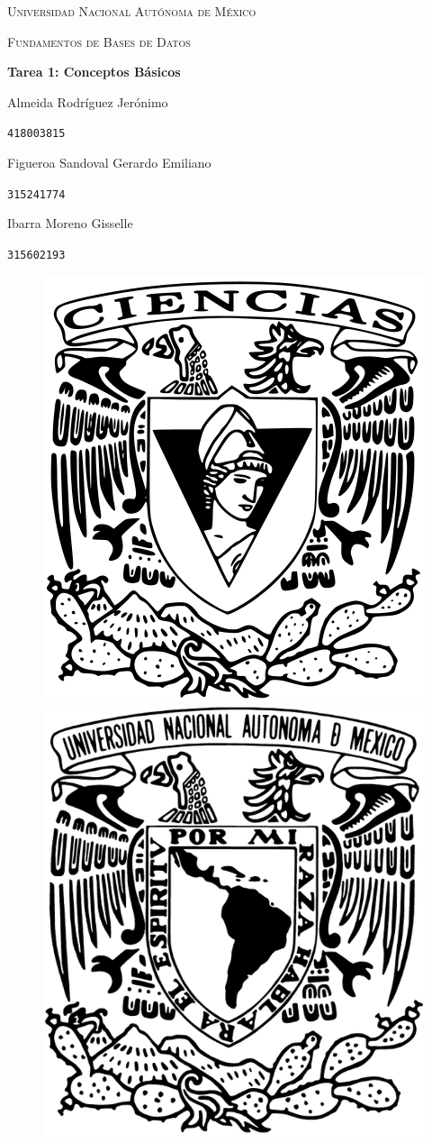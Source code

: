 \documentclass[a4paper, 12pt]{report}
\begin{document}
\begin{titlepage}
    \centering
    {\scshape\Huge Universidad Nacional Autónoma de México \par}
    \vspace{1.25cm}
    {\scshape\huge Fundamentos de Bases de Datos\par}
    \vspace{1.25cm}
    {\huge\bfseries Tarea 1: Conceptos Básicos\par}
    \vspace{1.25cm}
    {\Large\textsc Almeida Rodríguez Jerónimo\par}
    \vspace{.1cm}
    {\large\texttt{418003815}\par}
    \vspace{0.25cm}
    {\Large\textsc Figueroa Sandoval Gerardo Emiliano\par}
    \vspace{.1cm}
    {\large\texttt{315241774}\par}
    \vspace{0.25cm}
    {\Large\textsc Ibarra Moreno Gisselle \par}
    \vspace{.1cm}
    {\large\texttt{315602193}\par}
    \vspace{1.5cm}
    \vfill
    \begin{figure}[hb!]
        \includegraphics[width=.3\textwidth]
            {../logos/escudo_f-ciencias.png}\hfill
        \includegraphics[width=.3\textwidth]
            {../logos/Escudo_UNAM.png}\hfill
    \end{figure}
\end{titlepage}
\end{document}
